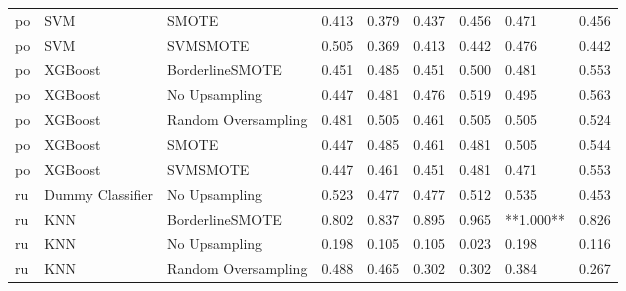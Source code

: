 \begin{tabular}{lllllllll}
      po &                          SVM &               SMOTE & 0.413 &                     0.379 &                 0.437 &                  0.456 &                                   0.471 &     0.456 \\
      po &                          SVM &            SVMSMOTE & 0.505 &                     0.369 &                 0.413 &                  0.442 &                                   0.476 &     0.442 \\
      po &                      XGBoost &     BorderlineSMOTE & 0.451 &                     0.485 &                 0.451 &                  0.500 &                                   0.481 &     0.553 \\
      po &                      XGBoost &       No Upsampling & 0.447 &                     0.481 &                 0.476 &                  0.519 &                                   0.495 &     0.563 \\
      po &                      XGBoost & Random Oversampling & 0.481 &                     0.505 &                 0.461 &                  0.505 &                                   0.505 &     0.524 \\
      po &                      XGBoost &               SMOTE & 0.447 &                     0.485 &                 0.461 &                  0.481 &                                   0.505 &     0.544 \\
      po &                      XGBoost &            SVMSMOTE & 0.447 &                     0.461 &                 0.451 &                  0.481 &                                   0.471 &     0.553 \\
      ru &             Dummy Classifier &       No Upsampling & 0.523 &                     0.477 &                 0.477 &                  0.512 &                                   0.535 &     0.453 \\
      ru &                          KNN &     BorderlineSMOTE & 0.802 &                     0.837 &                 0.895 &                  0.965 &                               **1.000** &     0.826 \\
      ru &                          KNN &       No Upsampling & 0.198 &                     0.105 &                 0.105 &                  0.023 &                                   0.198 &     0.116 \\
      ru &                          KNN & Random Oversampling & 0.488 &                     0.465 &                 0.302 &                  0.302 &                                   0.384 &     0.267 \\

\end{tabular}
